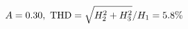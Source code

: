 \documentclass[preview]{standalone}
\begin{document}
\begin{align*}
\special{dvisvgm:raw <g id='unique000'>}A=0.30,\ \text{THD}=\sqrt{H_2^2+H_3^2}/H_1=5.8\%\special{dvisvgm:raw </g>}
\end{align*}
\end{document}
